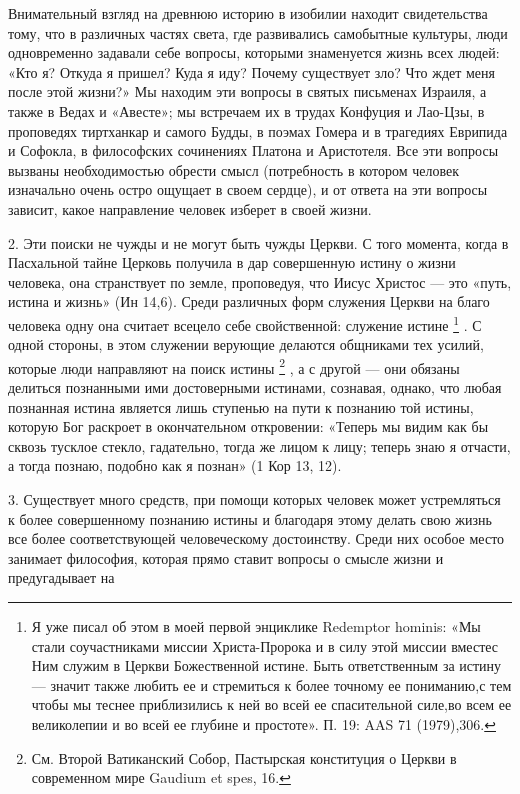 \documentclass[a5paper,10pt]{article}
\begin{document}
Внимательный взгляд на древнюю историю в изобилии находит свидетельства тому,
что в различных частях света, где развивались самобытные культуры, люди
одновременно задавали себе вопросы, которыми знаменуется жизнь всех людей: «Кто
я? Откуда я пришел? Куда я иду? Почему существует зло? Что ждет меня после этой
жизни?» Мы находим эти вопросы в святых письменах Израиля, а также в Ведах и
«Авесте»; мы встречаем их в трудах Конфуция и Лао-Цзы, в проповедях тиртханкар
и самого Будды, в поэмах Гомера и в трагедиях Еврипида и Софокла, в философских
сочинениях Платона и Аристотеля. Все эти вопросы вызваны необходимостью обрести
смысл (потребность в котором человек изначально очень остро ощущает в своем
сердце), и от ответа на эти вопросы зависит, какое направление человек изберет
в своей жизни.

2. Эти поиски не чужды и не могут быть чужды Церкви. С того момента, когда в
Пасхальной тайне Церковь получила в дар совершенную истину о жизни человека,
она странствует по земле, проповедуя, что Иисус Христос — это «путь, истина и
жизнь» (Ин 14,6). Среди различных форм служения Церкви на благо человека одну
она считает всецело себе свойственной: служение истине \footnote{Я уже писал об
    этом в моей первой энциклике Redemptor hominis: «Мы стали соучастниками
    миссии Христа-Пророка и в силу этой миссии вместес Ним служим в Церкви
    Божественной истине. Быть ответственным за истину — значит также любить ее
    и стремиться к более точному ее пониманию,с тем чтобы мы теснее
    приблизились к ней во всей ее спасительной силе,во всем ее великолепии и во
всей ее глубине и простоте». П. 19: AAS 71 (1979),306.} . С одной стороны, в
этом служении верующие делаются общниками тех усилий, которые люди направляют
на поиск истины \footnote{См. Второй Ватиканский Собор, Пастырская конституция
о Церкви в современном мире Gaudium et spes, 16.} , а с другой — они обязаны
делиться познанными ими достоверными истинами, сознавая, однако, что любая
познанная истина является лишь ступенью на пути к познанию той истины, которую
Бог раскроет в окончательном откровении: «Теперь мы видим как бы сквозь тусклое
стекло, гадательно, тогда же лицом к лицу; теперь знаю я отчасти, а тогда
познаю, подобно как я познан» (1 Кор 13, 12).

3. Существует много средств, при помощи которых человек может устремляться к
более совершенному познанию истины и благодаря этому делать свою жизнь все
более соответствующей человеческому достоинству. Среди них особое место
занимает философия, которая прямо ставит вопросы о смысле жизни и предугадывает
на
\end{document}
